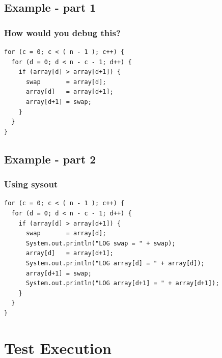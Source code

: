 \documentclass{beamer}
\begin{document}
\subsection{Example - part 1}
\begin{frame}[fragile]
\frametitle{How would you debug this?}
\begin{lstlisting}
for (c = 0; c < ( n - 1 ); c++) {
  for (d = 0; d < n - c - 1; d++) {
    if (array[d] > array[d+1]) {
      swap       = array[d];
      array[d]   = array[d+1];
      array[d+1] = swap;
    }
  }
}
\end{lstlisting}
\end{frame}


\subsection{Example - part 2}
\begin{frame}[fragile]
\frametitle{Using sysout}
\begin{lstlisting}
for (c = 0; c < ( n - 1 ); c++) {
  for (d = 0; d < n - c - 1; d++) {
    if (array[d] > array[d+1]) {
      swap       = array[d];
      System.out.println("LOG swap = " + swap);
      array[d]   = array[d+1];
      System.out.println("LOG array[d] = " + array[d]);
      array[d+1] = swap;
      System.out.println("LOG array[d+1] = " + array[d+1]);
    }
  }
}
\end{lstlisting}
\end{frame}

\section{Test Execution}
\end{document}
